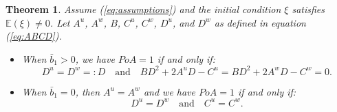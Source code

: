 \documentclass[11pt]{article}
\newtheorem{theorem}{Theorem}
\begin{document}
\begin{theorem}
	Assume (\ref{eq:assumptions}) and the initial condition $\xi$ satisfies $\mathbb{E}(\xi)  \neq 0$. Let $A^u$, $A^w$, $B$, $C^u$, $C^w$, $D^u$, and $D^w$ as defined in equation (\ref{eq:ABCD}).
	\begin{itemize}
		\item When $\bar{b}_1 > 0$, we have $PoA = 1$ if and only if:
		\begin{equation}
		D^u = D^w =:D \quad \text{and} \quad B D^2 + 2 A^{u} D - C^{u} = B D^2 + 2 A^{w} D - C^w  = 0.
		\label{eq:PoA=1_condition_b1_bar>0}
		\end{equation}
		\item When $\bar{b}_1 = 0$, then $A^u = A^w$ and we have $PoA = 1$ if and only if:
		\begin{equation}
			D^u = D^w \quad \text{and} \quad C^u = C^w. 
		\label{eq:PoA=1_condition_b1_bar=0}
		\end{equation}
	\end{itemize}

	\label{thm:PoA_equivalent_1}
\end{theorem}
\end{document}
